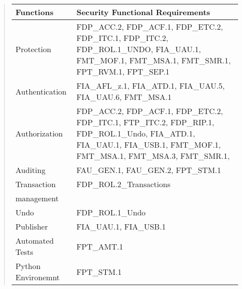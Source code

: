 \documentclass[12pt,english]{scrbook}
\begin{document}
\begin{quote}

\begin{longtable}[c]{|l|l|}
\hline
\textbf{
Functions
} & \textbf{
Security Functional Requirements
} \\
\hline
\endhead

Protection
 & 
FDP{\_}ACC.2, FDP{\_}ACF.1, FDP{\_}ETC.2, FDP{\_}ITC.1,
FDP{\_}ITC.2, FDP{\_}ROL.1{\_}UNDO, FIA{\_}UAU.1, FMT{\_}MOF.1,
FMT{\_}MSA.1, FMT{\_}SMR.1, FPT{\_}RVM.1, FPT{\_}SEP.1
 \\
\hline

Authentication
 & 
FIA{\_}AFL{\_}z.1, FIA{\_}ATD.1, FIA{\_}UAU.5, FIA{\_}UAU.6,
FMT{\_}MSA.1
 \\
\hline

Authorization
 & 
FDP{\_}ACC.2, FDP{\_}ACF.1, FDP{\_}ETC.2, FDP{\_}ITC.1,
FTP{\_}ITC.2, FDP{\_}RIP.1, FDP{\_}ROL.1{\_}Undo, FIA{\_}ATD.1,
FIA{\_}UAU.1, FIA{\_}USB.1, FMT{\_}MOF.1, FMT{\_}MSA.1,
FMT{\_}MSA.3, FMT{\_}SMR.1,
 \\
\hline

Auditing
 & 
FAU{\_}GEN.1, FAU{\_}GEN.2, FPT{\_}STM.1
 \\
\hline

Transaction
 & 
FDP{\_}ROL.2{\_}Transactions
 \\
\hline

management
 &  \\
\hline

Undo
 & 
FDP{\_}ROL.1{\_}Undo
 \\
\hline

Publisher
 & 
FIA{\_}UAU.1, FIA{\_}USB.1
 \\
\hline

Automated Tests
 & 
FPT{\_}AMT.1
 \\
\hline

Python Environemnt
 & 
FPT{\_}STM.1
 \\
\hline
\end{longtable}
\end{quote}


\end{document}
